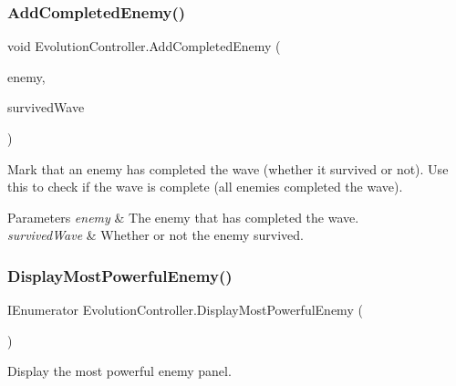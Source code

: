 \subsubsection{\texorpdfstring{Add\+Completed\+Enemy()}{AddCompletedEnemy()}}
{\footnotesize\ttfamily void Evolution\+Controller.\+Add\+Completed\+Enemy (\begin{DoxyParamCaption}\item[{Game\+Object}]{enemy,  }\item[{bool}]{survived\+Wave }\end{DoxyParamCaption})}



Mark that an enemy has completed the wave (whether it survived or not). Use this to check if the wave is complete (all enemies completed the wave). 


\begin{DoxyParams}{Parameters}
{\em enemy} & The enemy that has completed the wave.\\
\hline
{\em survived\+Wave} & Whether or not the enemy survived.\\
\hline
\end{DoxyParams}
\mbox{\label{class_evolution_controller_a56b57730a8b4707ffe1c8b8053871a84}} 
\subsubsection{\texorpdfstring{Display\+Most\+Powerful\+Enemy()}{DisplayMostPowerfulEnemy()}}
{\footnotesize\ttfamily I\+Enumerator Evolution\+Controller.\+Display\+Most\+Powerful\+Enemy (\begin{DoxyParamCaption}{ }\end{DoxyParamCaption})}



Display the most powerful enemy panel. 


